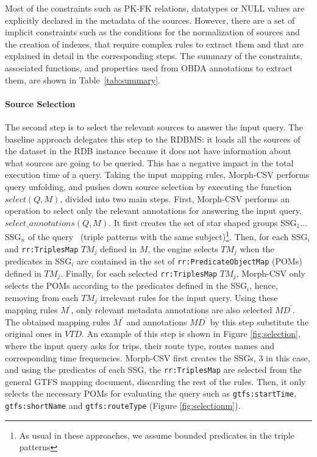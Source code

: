 Most of the constraints such as PK-FK relations, datatypes or NULL values are explicitly declared in the metadata of the sources. However, there are a set of implicit constraints such as the conditions for the normalization of sources and the creation of indexes, that require complex rules to extract them and that are explained in detail in the corresponding steps. The summary of the constraints, associated functions, and properties used from OBDA annotations to extract them, are shown in Table~\ref{tab:summary}.


\paragraph{Source Selection}
The second step is to select the relevant sources to answer the input query. The baseline approach delegates this step to the RDBMS: it loads all the sources of the dataset in the RDB instance because it does not have information about what sources are going to be queried. This has a negative impact in the total execution time of a query. Taking the input mapping rules, Morph-CSV performs query unfolding, and pushes down source selection by executing the function $select(Q,M)$, divided into two main steps. First, Morph-CSV performs an operation to select only the relevant annotations for answering the input query, $select\_annotations(Q,M)$. It first creates the set of star shaped groups SSG$_1\ldots $SSG$_n$ of the query~\citep{vidal2010efficient} (triple patterns with the same subject)\footnote{As usual in these approaches, we assume bounded predicates in the triple patterns}. Then, for each SSG$_i$ and \texttt{rr:TriplesMap} $TM_j$ defined in $M$, the engine selects $TM_j$ when the predicates in SSG$_i$ are contained in the set of \texttt{rr:PredicateObjectMap} (POMs) defined in $TM_j$. Finally, for each selected \texttt{rr:TriplesMap} $TM_j$, Morph-CSV only selects the POMs according to the predicates defined in the SSG$_i$, hence, removing from each $TM_j$ irrelevant rules for the input query. Using these mapping rules $M^{'}$, only relevant metadata annotations are also selected $MD^{'}$. The obtained mapping rules $M^{'}$ and annotations $MD^{'}$ by this step substitute the original ones in $VTD$. An example of this step is shown in Figure \ref{fig:selection}, where the input query asks for trips, their route type, routes names and corresponding time frequencies. Morph-CSV first creates the SSGs, 3 in this case, and using the predicates of each SSG, the \texttt{rr:TriplesMap} are selected from the general GTFS mapping document, discarding the rest of the rules. Then, it only selects the necessary POMs for evaluating the query such as \texttt{gtfs:startTime}, \texttt{gtfs:shortName} and \texttt{gtfs:routeType} (Figure \ref{fig:selectionm}).

